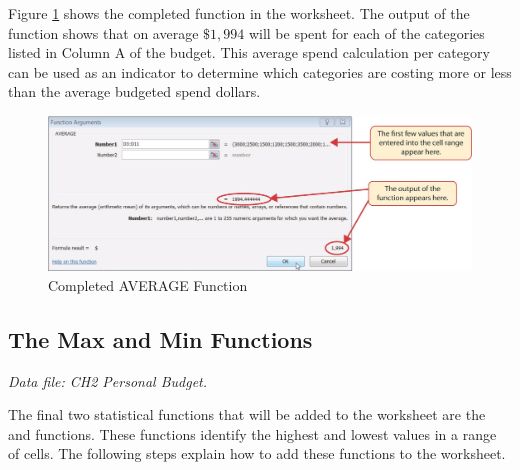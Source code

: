 Figure \ref{02:fig23} shows the completed  function in the  worksheet. The output of the function shows that on average $ \$1,994 $ will be spent for each of the categories listed in Column A of the budget. This average spend calculation per category can be used as an indicator to determine which categories are costing more or less than the average budgeted spend dollars.

\begin{figure}[H]
	\centering
	\includegraphics[width=\maxwidth{.95\linewidth}]{gfx/ch02_fig23}
	\caption{Completed AVERAGE Function}
	\label{02:fig23}
\end{figure}

\subsection{The Max and Min Functions}

\textit{Data file: CH2 Personal Budget.}

The final two statistical functions that will be added to the  worksheet are the  and  functions. These functions identify the highest and lowest values in a range of cells. The following steps explain how to add these functions to the  worksheet.

